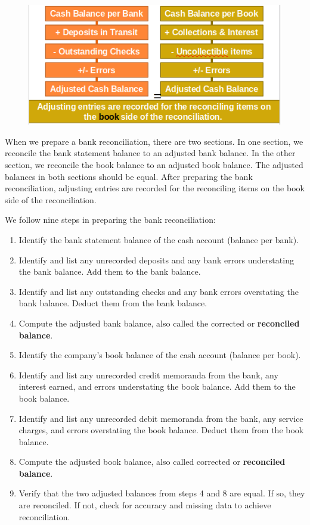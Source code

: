 \documentclass[../main.tex]{subfiles}
\begin{document}
	\begin{figure}[ht]
		\centering
		\includegraphics[width=0.7\columnwidth]{images/c5/bank_reconciliation_guidelines.png}
	\end{figure}
	
	When we prepare a bank reconciliation, there are two sections. In one 
	section, we reconcile the bank statement balance to an adjusted bank 
	balance. In the other section, we reconcile the book balance to an adjusted 
	book balance. The adjusted balances in both sections should be equal. After 
	preparing the bank reconciliation, adjusting entries are recorded for the 
	reconciling items on the book side of the reconciliation. 
	
	We follow nine steps in preparing the bank reconciliation:
	\begin{enumerate}[noitemsep]
		\item Identify the bank statement balance of the cash account (balance 
		per bank).
		\item Identify and list any unrecorded deposits and any bank errors 
		understating the bank balance. Add them to the bank balance.
		\item Identify and list any outstanding checks and any bank errors 
		overstating the bank balance. Deduct them from the bank balance.
		\item Compute the adjusted bank balance, also called the corrected or 
		\textbf{reconciled balance}.
		\item Identify the company’s book balance of the cash account (balance 
		per book).
		\item Identify and list any unrecorded credit memoranda from the bank, 
		any interest earned, and errors understating the book balance. Add them 
		to the book balance.
		\item Identify and list any unrecorded debit memoranda from the bank, 
		any service charges, and errors overstating the book balance. Deduct 
		them from the book balance.
		\item Compute the adjusted book balance, also called corrected or 
		\textbf{reconciled balance}.
		\item Verify that the two adjusted balances from steps 4 and 8 are 
		equal. If so, they are reconciled. If not, check for accuracy and 
		missing data to achieve reconciliation.
	\end{enumerate}
	
\end{document}
